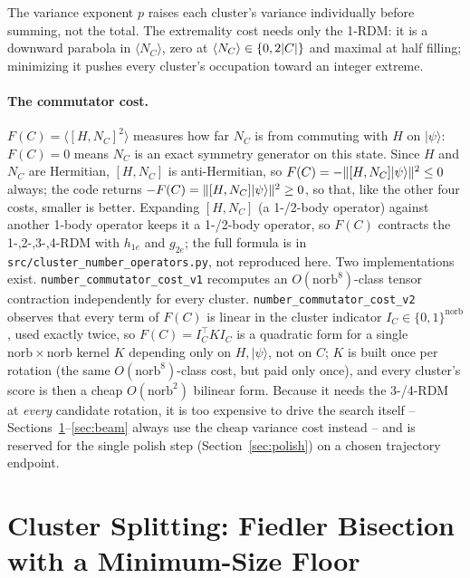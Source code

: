 \documentclass[10pt]{article}
\DeclarePairedDelimiter{\abs}{\lvert}{\rvert}
\DeclarePairedDelimiter{\norm}{\lVert}{\rVert}
\newcommand{\ket}[1]{\lvert #1 \rangle}
\newcommand{\expval}[1]{\langle #1 \rangle}
\begin{document}
The variance exponent $p$ raises each cluster's variance individually before summing, not the
total. The extremality cost needs only the 1-RDM: it is a downward parabola in $\expval{N_C}$,
zero at $\expval{N_C}\in\{0,2\abs{C}\}$ and maximal at half filling; minimizing it pushes every
cluster's occupation toward an integer extreme.

\paragraph{The commutator cost.} $F(C)=\expval{[H,N_C]^2}$ measures how far $N_C$ is from
commuting with $H$ on $\ket{\psi}$: $F(C)=0$ means $N_C$ is an exact symmetry generator on this
state. Since $H$ and $N_C$ are Hermitian, $[H,N_C]$ is anti-Hermitian, so
$F(C)=-\norm{[H,N_C]\ket{\psi}}^2\le0$ always; the code returns $-F(C)=\norm{[H,N_C]\ket{\psi}}^2\ge0$,
so that, like the other four costs, smaller is better. Expanding $[H,N_C]$ (a 1-/2-body
operator) against another 1-body operator keeps it a 1-/2-body operator, so $F(C)$ contracts
the 1-,2-,3-,4-RDM with $h_{1e}$ and $g_{2e}$; the full formula is in
\texttt{src/cluster\_number\_operators.py}, not reproduced here.
Two implementations exist. \texttt{number\_commutator\_cost\_v1} recomputes an
$O(\mathrm{norb}^8)$-class tensor contraction independently for every cluster.
\texttt{number\_commutator\_cost\_v2} observes that every term of $F(C)$ is linear in the
cluster indicator $I_C\in\{0,1\}^\mathrm{norb}$, used exactly twice, so $F(C)=I_C^\top K I_C$ is
a quadratic form for a single $\mathrm{norb}\times\mathrm{norb}$ kernel $K$ depending only on
$H,\ket{\psi}$, not on $C$; $K$ is built once per rotation (the same $O(\mathrm{norb}^8)$-class
cost, but paid only once), and every cluster's score is then a cheap $O(\mathrm{norb}^2)$
bilinear form. Because it needs the 3-/4-RDM at \emph{every} candidate rotation, it is too
expensive to drive the search itself -- Sections~\ref{sec:fiedler}--\ref{sec:beam} always use
the cheap variance cost instead -- and is reserved for the single polish step
(Section~\ref{sec:polish}) on a chosen trajectory endpoint.

\section{Cluster Splitting: Fiedler Bisection with a Minimum-Size Floor}
\label{sec:fiedler}
\end{document}
